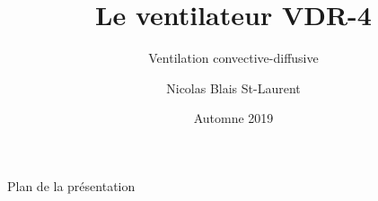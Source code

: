 \documentclass[
	10pt, 
	aspectratio=169, 
]{beamer}
\title{Le ventilateur VDR-4}
\subtitle{Ventilation convective-diffusive}
\author{Nicolas Blais St-Laurent \scalebox{0.75}{inh}}
\institute{Service d'inhalothérapie}
\date{Automne 2019}
\begin{document}
\nbtitlepage

\begin{frame}{Plan de la présentation}
	\tableofcontents
\end{frame}





\end{document}
